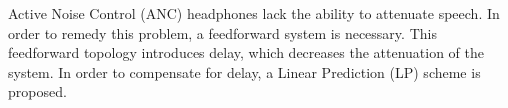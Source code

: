 \large

%
%
%
%
%
%




Active Noise Control (ANC) headphones lack the ability to attenuate speech.
In order to remedy this problem, a feedforward system is necessary.
This feedforward topology introduces delay, which decreases the attenuation of the system.
In order to compensate for delay, a Linear Prediction (LP) scheme is proposed.


 











